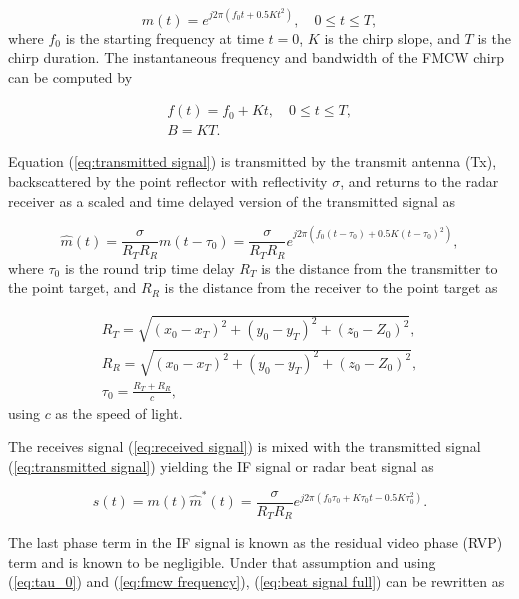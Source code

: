 \begin{equation}
	\label{eq:transmitted signal}
	m(t) = e^{j2\pi(f_0t + 0.5Kt^2)}, \quad 0 \leq t \leq T,
\end{equation}
where $f_0$ is the starting frequency at time $t = 0$, $K$ is the chirp slope, and $T$ is the chirp duration. The instantaneous frequency and bandwidth of the FMCW chirp can be computed by

\begin{gather}
	\label{eq:fmcw frequency}
	f(t) = f_0 + Kt, \quad 0 \leq t \leq T, \\
	B = KT.
	\label{eq:fmcw bandwidth}
\end{gather}

Equation (\ref{eq:transmitted signal}) is transmitted by the transmit antenna (Tx), backscattered by the point reflector with reflectivity $\sigma$, and returns to the radar receiver as a scaled and time delayed version of the transmitted signal as

\begin{equation}
	\label{eq:received signal}
	\hat{m}(t) = \frac{\sigma}{R_T R_R} m(t-\tau_0) = \frac{\sigma}{R_T R_R} e^{j2\pi(f_0(t-\tau_0) + 0.5K(t-\tau_0)^2)},
\end{equation}
where $\tau_0$ is the round trip time delay $R_T$ is the distance from the transmitter to the point target, and $R_R$ is the distance from the receiver to the point target as

\begin{gather}
	R_T = \sqrt{(x_0 - x_T)^2 + (y_0 - y_T)^2 + (z_0 - Z_0)^2},\\
	R_R = \sqrt{(x_0 - x_T)^2 + (y_0 - y_T)^2 + (z_0 - Z_0)^2},\\
	\tau_0 = \frac{R_T + R_R}{c},
	\label{eq:tau_0}
\end{gather}
using $c$ as the speed of light.

The receives signal (\ref{eq:received signal}) is mixed with the transmitted signal (\ref{eq:transmitted signal}) yielding the IF signal or radar beat signal as

\begin{equation}
	\label{eq:beat signal full}
	s(t) = m(t)\hat{m}^*(t) = \frac{\sigma}{R_T R_R} e^{j2\pi(f_0\tau_0 + K\tau_0t - 0.5K\tau_0^2)}.
\end{equation}

The last phase term in the IF signal is known as the residual video phase (RVP) term and is known to be negligible. Under that assumption and using (\ref{eq:tau_0}) and (\ref{eq:fmcw frequency}), (\ref{eq:beat signal full}) can be rewritten as 

